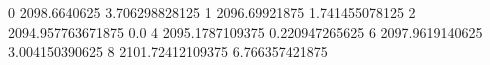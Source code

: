 0 2098.6640625 3.706298828125
1 2096.69921875 1.741455078125
2 2094.957763671875 0.0
4 2095.1787109375 0.220947265625
6 2097.9619140625 3.004150390625
8 2101.72412109375 6.766357421875
